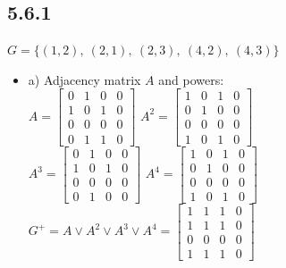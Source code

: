 \documentclass{article}
\begin{document}
\subsection*{5.6.1}
$G = \{(1,2),\ (2,1),\ (2,3),\ (4,2),\ (4,3)\}$
\begin{itemize}
    \item a) Adjacency matrix $A$ and powers:\\
    $A = \begin{bmatrix} 0 & 1 & 0 & 0 \\ 1 & 0 & 1 & 0 \\ 0 & 0 & 0 & 0 \\ 0 & 1 & 1 & 0 \end{bmatrix}$\quad
    $A^2 = \begin{bmatrix} 1 & 0 & 1 & 0 \\ 0 & 1 & 0 & 0 \\ 0 & 0 & 0 & 0 \\ 1 & 0 & 1 & 0 \end{bmatrix}$\\[6pt]
    $A^3 = \begin{bmatrix} 0 & 1 & 0 & 0 \\ 1 & 0 & 1 & 0 \\ 0 & 0 & 0 & 0 \\ 0 & 1 & 0 & 0 \end{bmatrix}$\quad
    $A^4 = \begin{bmatrix} 1 & 0 & 1 & 0 \\ 0 & 1 & 0 & 0 \\ 0 & 0 & 0 & 0 \\ 1 & 0 & 1 & 0 \end{bmatrix}$\\[6pt]
    $G^+ = A \lor A^2 \lor A^3 \lor A^4 = \begin{bmatrix} 1 & 1 & 1 & 0 \\ 1 & 1 & 1 & 0 \\ 0 & 0 & 0 & 0 \\ 1 & 1 & 1 & 0 \end{bmatrix}$
\end{itemize}
\end{document}
